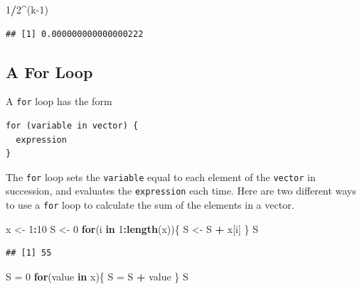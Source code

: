 \documentclass[
]{krantz}
\newenvironment{Shaded}{\begin{snugshade}}{\end{snugshade}}
\newcommand{\ControlFlowTok}[1]{\textcolor[rgb]{0.13,0.29,0.53}{\textbf{#1}}}
\newcommand{\DecValTok}[1]{\textcolor[rgb]{0.00,0.00,0.81}{#1}}
\newcommand{\KeywordTok}[1]{\textcolor[rgb]{0.13,0.29,0.53}{\textbf{#1}}}
\newcommand{\NormalTok}[1]{#1}
\newcommand{\OperatorTok}[1]{\textcolor[rgb]{0.81,0.36,0.00}{\textbf{#1}}}
\newcommand{\StringTok}[1]{\textcolor[rgb]{0.31,0.60,0.02}{#1}}
\begin{document}
\begin{Shaded}
\begin{Highlighting}[]
\DecValTok{1}\OperatorTok{/}\DecValTok{2}\OperatorTok{\^{}}\NormalTok{(k}\DecValTok{{-}1}\NormalTok{)}
\end{Highlighting}
\end{Shaded}

\begin{verbatim}
## [1] 0.000000000000000222
\end{verbatim}

\hypertarget{a-for-loop}{%
\subsection{A For Loop}\label{a-for-loop}}

A \texttt{for} loop has the form

\begin{verbatim}
for (variable in vector) {
  expression
}
\end{verbatim}

The \texttt{for} loop sets the \texttt{variable} equal to each element of the \texttt{vector} in succession, and evaluates the \texttt{expression} each time. Here are two different ways to use a \texttt{for} loop to calculate the sum of the elements in a vector.

\begin{Shaded}
\begin{Highlighting}[]
\NormalTok{x \textless{}{-}}\StringTok{ }\DecValTok{1}\OperatorTok{:}\DecValTok{10}
\NormalTok{S \textless{}{-}}\StringTok{ }\DecValTok{0}
\ControlFlowTok{for}\NormalTok{(i }\ControlFlowTok{in} \DecValTok{1}\OperatorTok{:}\KeywordTok{length}\NormalTok{(x))\{}
\NormalTok{    S \textless{}{-}}\StringTok{ }\NormalTok{S }\OperatorTok{+}\StringTok{ }\NormalTok{x[i]}
\NormalTok{\}}
\NormalTok{S}
\end{Highlighting}
\end{Shaded}

\begin{verbatim}
## [1] 55
\end{verbatim}

\begin{Shaded}
\begin{Highlighting}[]
\NormalTok{S =}\StringTok{ }\DecValTok{0}
\ControlFlowTok{for}\NormalTok{(value }\ControlFlowTok{in}\NormalTok{ x)\{}
\NormalTok{  S =}\StringTok{ }\NormalTok{S }\OperatorTok{+}\StringTok{ }\NormalTok{value}
\NormalTok{\}}
\NormalTok{S}
\end{Highlighting}
\end{Shaded}
\end{document}
